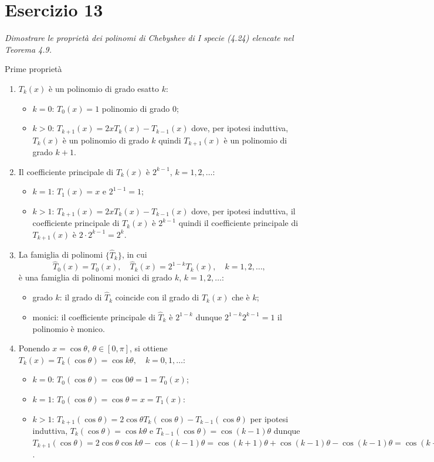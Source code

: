 \section{Esercizio 13}
\label{sub:Esercizio 13}
\emph{Dimostrare le proprietà dei polinomi di Chebyshev di I specie (4.24) elencate nel Teorema 4.9.
}
\begin{sol}
	\normalfont
	Prime proprietà
	\begin{enumerate}
		\item $T_k(x)$ è un polinomio di grado esatto $k$:
	\begin{itemize}
		\item $k=0$: $T_0(x)=1$ polinomio di grado $0$;
		\item $k>0$: $T_{k+1}(x)=2xT_k(x)-T_{k-1}(x)$ dove, per ipotesi induttiva, $T_k(x)$ è un polinomio di grado $k$ quindi $T_{k+1}(x)$ è un polinomio di grado $k+1$.
	\end{itemize}
		\item Il coefficiente principale di $T_k(x)$ è $2^{k-1}$, $k=1,2,\ldots$:
		\begin{itemize}
		\item $k=1$: $T_1(x)=x$ e $2^{1-1}=1$;
		\item $k>1$: $T_{k+1}(x)=2xT_k(x)-T_{k-1}(x)$ dove, per ipotesi induttiva, il coefficiente principale di $T_k(x)$ è $2^{k-1}$ quindi il coefficiente principale di $T_{k+1}(x)$ è $2\cdot2^{k-1}=2^k$.
	\end{itemize}
		\item La famiglia di polinomi $\{\hat{T}_k\}$, in cui $$\hat{T}_0(x)=T_0(x),\quad\hat{T}_k(x)=2^{1-k}T_k(x),\quad k=1,2,\ldots,$$ è una famiglia di polinomi monici di grado $k$, $k=1,2,\ldots$:
	\begin{itemize}
		\item grado $k$: il grado di $\hat{T}_k$ coincide con il grado di $T_k(x)$ che è $k$;
		\item monici: il coefficiente principale di $\hat{T}_k$ è $2^{1-k}$ dunque $2^{1-k}2^{k-1}=1$ il polinomio è monico.
	\end{itemize}
		\item Ponendo $x=\cos{\theta}$, $\theta\in[0,\pi]$, si ottiene $T_k(x)=T_k(\cos{\theta})=\cos{k\theta},\quad k=0,1,\ldots$:
	\begin{itemize}
		\item $k=0$: $T_0(\cos{\theta})=\cos{0\theta}=1=T_0(x)$;
		\item $k=1$: $T_0(\cos{\theta})=\cos{\theta}=x=T_1(x)$:
		\item $k>1$: $T_{k+1}(\cos{\theta})=2\cos{\theta}T_k({\cos{\theta}})-T_{k-1}(\cos{\theta})$ per ipotesi induttiva, $T_k({\cos{\theta}})=\cos{k\theta}$ e $T_{k-1}(\cos{\theta})=\cos{(k-1)\theta}$ dunque $T_{k+1}(\cos{\theta})=2\cos{\theta}\cos{k\theta}-\cos{(k-1)\theta}=\cos{(k+1)\theta}+\cos{(k-1)\theta}-\cos{(k-1)\theta}=\cos{(k+1)\theta}=T_{k+1}(x)$.

\end{itemize}
\end{enumerate}
\end{sol}
